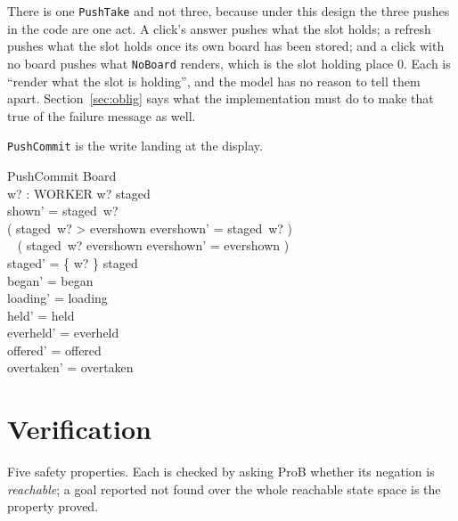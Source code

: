 \documentclass[a4paper,10pt,fleqn]{article}
\begin{document}
There is one \texttt{PushTake} and not three, because under this design the
three pushes in the code are one act. A click's answer pushes what the slot
holds; a refresh pushes what the slot holds once its own board has been stored;
and a click with no board pushes what \texttt{NoBoard} renders, which is the
slot holding place $0$. Each is ``render what the slot is holding'', and the
model has no reason to tell them apart. Section~\ref{sec:oblig} says what the
implementation must do to make that true of the failure message as well.

\texttt{PushCommit} is the write landing at the display.

\begin{schema}{PushCommit}
  \Delta Board \\
  w? : WORKER
\where
  w? \in \dom staged \\
  shown' = staged~w? \\
  ( staged~w? > evershown \land evershown' = staged~w? ) \lor \\
  \quad~ ( staged~w? \leq evershown \land evershown' = evershown ) \\
  staged' = \{ w? \} \ndres staged \\
  began' = began \\
  loading' = loading \\
  held' = held \\
  everheld' = everheld \\
  offered' = offered \\
  overtaken' = overtaken
\end{schema}

\section{Verification}
\label{sec:verify}

Five safety properties. Each is checked by asking ProB whether its negation is
\emph{reachable}; a goal reported not found over the whole reachable state space
is the property proved.
\end{document}
